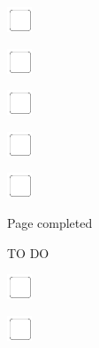 \documentclass[11pt,titlepage]{article}
\begin{document}
\noindent
\includegraphics[]{checkbox-4mm.pdf}

\vspace{10mm}

\noindent
\includegraphics[]{checkbox-4mm.pdf}

\vspace{10mm}

\noindent
\includegraphics[]{checkbox-4mm.pdf}

\vspace{10mm}

\noindent
\includegraphics[]{checkbox-4mm.pdf}

\vspace{10mm}

\noindent
\includegraphics[]{checkbox-4mm.pdf}

\vspace{4mm}

\hfill Page completed \hspace{20mm}

\pagebreak

\small
\hfill TO DO

\vspace{6mm}

\noindent
\includegraphics[]{checkbox-4mm.pdf}

\vspace{10mm}

\noindent
\includegraphics[]{checkbox-4mm.pdf}

\vspace{10mm}
\end{document}
